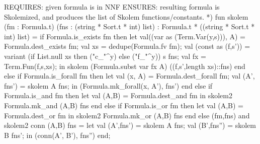 REQUIRES: given formula is in NNF
ENSURES: resulting formula is Skolemized, and produces the
         list of Skolem functions/constants. *)
fun skolem (fm : Formula.t) (fns : (string * Sort.t * int) list)
  : Formula.t * ((string * Sort.t * int) list) =
  if Formula.is_exists fm
  then let val((var as (Term.Var(y,s))), A) = Formula.dest_exists fm;
           val xs = dedupe(Formula.fv fm);
           val (const as (f,s')) = variant (if List.null xs
                                 then ("c_"^y)
                                 else ("f_"^y))
                                s
                                fns;
           val fx = Term.Fun(f,s,xs);
       in skolem (Formula.subst var fx A) ((f,s',length xs)::fns) end
  else if Formula.is_forall fm
  then let val (x, A) = Formula.dest_forall fm;
           val (A', fns') = skolem A fns;
       in (Formula.mk_forall(x, A'), fns') end
  else if Formula.is_and fm
  then let val (A,B) = Formula.dest_and fm
       in skolem2 Formula.mk_and (A,B) fns end
  else if Formula.is_or fm
  then let val (A,B) = Formula.dest_or fm
       in skolem2 Formula.mk_or (A,B) fns end
  else (fm,fns)
and skolem2 conn (A,B) fns =
    let val (A',fns') = skolem A fns;
        val (B',fns'') = skolem B fns';
    in (conn(A', B'), fns'') end;
\nwendcode{}\nwdocspar

